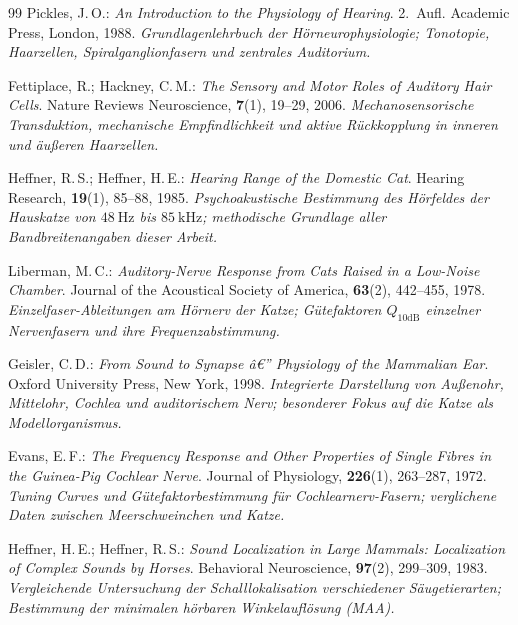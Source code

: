 ﻿\documentclass[12pt,a4paper,titlepage]{report}
\begin{document}
\begin{thebibliography}{99}
Pickles, J.\,O.:
\textit{An Introduction to the Physiology of Hearing}. 2.~Aufl.
Academic Press, London, 1988.
\newline\textit{Grundlagenlehrbuch der Hörneurophysiologie; Tonotopie,
Haarzellen, Spiralganglionfasern und zentrales Auditorium.}

Fettiplace, R.; Hackney, C.\,M.:
\textit{The Sensory and Motor Roles of Auditory Hair Cells}.
Nature Reviews Neuroscience, \textbf{7}(1), 19--29, 2006.
\newline\textit{Mechanosensorische Transduktion, mechanische Empfindlichkeit
und aktive Rückkopplung in inneren und äußeren Haarzellen.}

Heffner, R.\,S.; Heffner, H.\,E.:
\textit{Hearing Range of the Domestic Cat}.
Hearing Research, \textbf{19}(1), 85--88, 1985.
\newline\textit{Psychoakustische Bestimmung des Hörfeldes der Hauskatze
von $\SI{48}{\hertz}$ bis $\SI{85}{\kilo\hertz}$; methodische Grundlage
aller Bandbreitenangaben dieser Arbeit.}

Liberman, M.\,C.:
\textit{Auditory-Nerve Response from Cats Raised in a Low-Noise Chamber}.
Journal of the Acoustical Society of America, \textbf{63}(2), 442--455, 1978.
\newline\textit{Einzelfaser-Ableitungen am Hörnerv der Katze; Gütefaktoren
$Q_{10\text{dB}}$ einzelner Nervenfasern und ihre Frequenzabstimmung.}

Geisler, C.\,D.:
\textit{From Sound to Synapse â€” Physiology of the Mammalian Ear}.
Oxford University Press, New York, 1998.
\newline\textit{Integrierte Darstellung von Außenohr, Mittelohr, Cochlea und
auditorischem Nerv; besonderer Fokus auf die Katze als Modellorganismus.}

Evans, E.\,F.:
\textit{The Frequency Response and Other Properties of Single Fibres in the
Guinea-Pig Cochlear Nerve}.
Journal of Physiology, \textbf{226}(1), 263--287, 1972.
\newline\textit{Tuning Curves und Gütefaktorbestimmung für Cochlearnerv-Fasern;
verglichene Daten zwischen Meerschweinchen und Katze.}

Heffner, H.\,E.; Heffner, R.\,S.:
\textit{Sound Localization in Large Mammals: Localization of Complex Sounds
by Horses}.
Behavioral Neuroscience, \textbf{97}(2), 299--309, 1983.
\newline\textit{Vergleichende Untersuchung der Schalllokalisation verschiedener
Säugetierarten; Bestimmung der minimalen hörbaren Winkelauflösung (MAA).}


\end{thebibliography}
\end{document}
